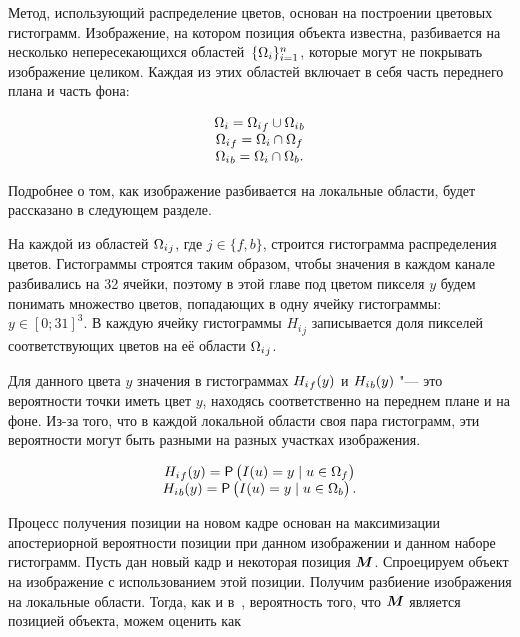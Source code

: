 Метод, использующий распределение цветов, основан на построении цветовых
гистограмм.
Изображение, на котором позиция объекта известна, разбивается на несколько
непересекающихся областей~$\{\Omega_i\}_{i = 1}^n$, которые могут не покрывать
изображение целиком.
Каждая из этих областей включает в себя часть переднего плана и часть фона:

\begin{equation}
\label{eqn:histo_partitioning}
\begin{array}{c}
\Omega_i = {\Omega_i}_f \cup {\Omega_i}_b \\
{\Omega_i}_f = \Omega_i \cap \Omega_f \\
{\Omega_i}_b = \Omega_i \cap \Omega_b
\text{.}
\end{array}
\end{equation}

Подробнее о том, как изображение разбивается на локальные области, будет
рассказано в следующем разделе.

На каждой из областей ${\Omega_i}_j$, где $j \in \{ f, b\}$, строится
гистограмма распределения цветов.
Гистограммы строятся таким образом, чтобы значения в каждом канале разбивались
на 32 ячейки, поэтому в этой главе под цветом пикселя $y$ будем понимать
множество цветов, попадающих в одну ячейку гистограммы: $y \in [0; 31]^3$.
В каждую ячейку гистограммы ${H_i}_j$ записывается доля пикселей
соответствующих
цветов на её области ${\Omega_i}_j$.

Для данного цвета $y$ значения в гистограммах ${H_i}_f(y)$ и
${H_i}_b(y)$ "--- это вероятности точки иметь цвет $y$, находясь
соответственно на переднем плане и на фоне.
Из-за того, что в каждой локальной области своя пара гистограмм, эти
вероятности могут быть разными на разных участках изображения.

\begin{equation}
\label{eqn:H_f_Y}
\begin{array}{c}
{\ensuremath{H_i}}_f(y) = \mathsf{P} \left( I(\mathnormal{u}) = y \mid \mathnormal{u} \in \Omega_f \right) \\
{H_i}_b(y) = \mathsf{P} \left( I(\mathnormal{u}) = y \mid \mathnormal{u} \in \Omega_b \right)
\text{.}
\end{array}
\end{equation}

Процесс получения позиции на новом кадре основан на максимизации апостериорной
вероятности позиции при данном изображении и данном наборе гистограмм.
Пусть дан новый кадр и некоторая позиция $\bm{M}$.
Спроецируем объект на изображение с использованием этой позиции.
Получим разбиение изображения на локальные области.
Тогда, как и в~\cite{Hexner2016}, вероятность того, что $\bm{M}$ является
позицией
объекта, можем оценить как

